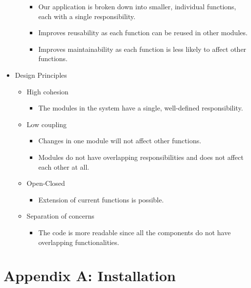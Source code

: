 \documentclass[a4paper]{scrreprt}
\begin{document}
\begin{itemize}
\begin{itemize}
\begin{itemize}
            \item Our application is broken down into smaller, individual functions, each with a single responsibility.
            \item Improves reusability as each function can be reused in other modules.
            \item Improves maintainability as each function is less likely to affect other functions.
        \end{itemize}
    \end{itemize}
    \item Design Principles
    \begin{itemize}
        \item High cohesion
        \begin{itemize}
            \item The modules in the system have a single, well-defined responsibility.
        \end{itemize}
        \item Low coupling
        \begin{itemize}
            \item Changes in one module will not affect other functions.
            \item Modules do not have overlapping responsibilities and does not affect each other at all.
        \end{itemize}
        \item Open-Closed
        \begin{itemize}
            \item Extension of current functions is possible.
        \end{itemize}
        \item Separation of concerns
        \begin{itemize}
            \item The code is more readable since all the components do not have overlapping functionalities.
        \end{itemize}
    \end{itemize}
\end{itemize}


\chapter{Appendix A: Installation}
\end{document}
